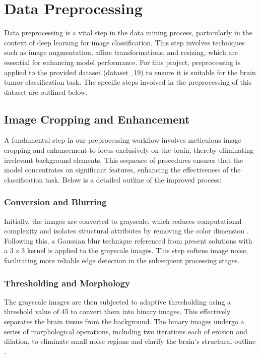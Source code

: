 \section{Data Preprocessing}\label{data_preprocessing}

Data preprocessing is a vital step in the data mining process, particularly in the context of deep learning for image classification. This step involves techniques such as image augmentation, affine transformations, and resizing, which are essential for enhancing model performance. For this project, preprocessing is applied to the provided dataset (dataset\_19) to ensure it is suitable for the brain tumor classification task. The specific steps involved in the preprocessing of this dataset are outlined below.

\subsection{Image Cropping and Enhancement}\label{image_cropping_enhancement}

A fundamental step in our preprocessing workflow involves meticulous image cropping and enhancement to focus exclusively on the brain, thereby eliminating irrelevant background elements. This sequence of procedures ensures that the model concentrates on significant features, enhancing the effectiveness of the classification task. Below is a detailed outline of the improved process:

\subsubsection{Conversion and Blurring}

Initially, the images are converted to grayscale, which reduces computational complexity and isolates structural attributes by removing the color dimension \cite{healthcare10091801}. Following this, a Gaussian blur technique referenced from present solutions \cite{brainsci13091320} with a $3 \times 3$ kernel is applied to the grayscale images. This step softens image noise, facilitating more reliable edge detection in the subsequent processing stages.

\subsubsection{Thresholding and Morphology}

The grayscale images are then subjected to adaptive thresholding using a threshold value of 45 to convert them into binary images. This effectively separates the brain tissue from the background. The binary images undergo a series of morphological operations, including two iterations each of erosion and dilation, to eliminate small noise regions and clarify the brain's structural outline \cite{Vimala_Srinivasan_Mathivanan_Mahalakshmi_Jayagopal_Dalu_2023}.

